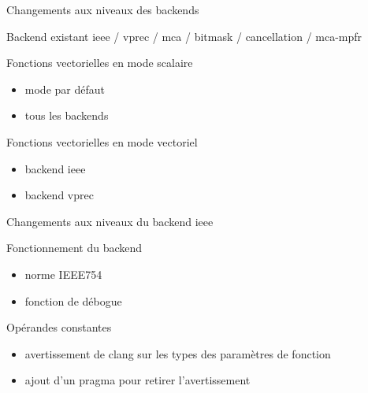 \documentclass{beamer}
\begin{document}
\begin{frame}{Changements aux niveaux des backends}

  \begin{block}{Backend existant}
    ieee / vprec / mca / bitmask / cancellation / mca-mpfr
  \end{block}

  \begin{block}{Fonctions vectorielles en mode scalaire}
    \begin{itemize}
    \item mode par défaut
    \item tous les backends
    \end{itemize}
  \end{block}

  \begin{block}{Fonctions vectorielles en mode vectoriel}
    \begin{itemize}
    \item backend ieee
    \item backend vprec
    \end{itemize}
  \end{block}

\end{frame}

\begin{frame}{Changements aux niveaux du backend ieee}

  \begin{block}{Fonctionnement du backend}
    \begin{itemize}
    \item norme IEEE754
    \item fonction de débogue
    \end{itemize}
  \end{block}

  \begin{block}{Opérandes constantes}
    \begin{itemize}
    \item avertissement de clang sur les types des paramètres de fonction
    \item ajout d'un pragma pour retirer l'avertissement
    \end{itemize}
  \end{block}

\end{frame}
\end{document}
